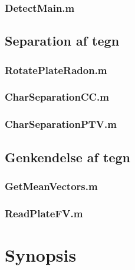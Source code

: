 \documentclass[11pt,a4paper,final]{article}
\begin{document}
\subsubsection{DetectMain.m}
\label{code:DetectMain}



\subsection{Separation af tegn}
\subsubsection{RotatePlateRadon.m}

\subsubsection{CharSeparationCC.m}
\label{code:CharSeparationCC}

\subsubsection{CharSeparationPTV.m}
\label{code:CharSeparationPTV}

\subsection{Genkendelse af tegn}
\subsubsection{GetMeanVectors.m}
\label{code:GetMeanVectors}

\subsubsection{ReadPlateFV.m}
\label{code:ReadPlateFV}



\section{Synopsis}

\end{document}
